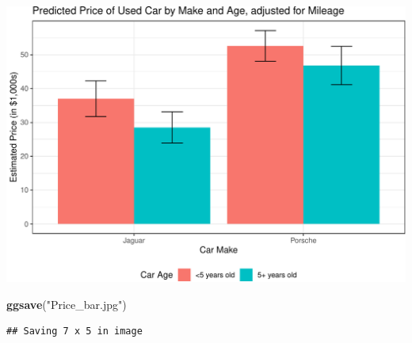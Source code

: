 \documentclass[]{article}
\newenvironment{Shaded}{\begin{snugshade}}{\end{snugshade}}
\newcommand{\KeywordTok}[1]{\textcolor[rgb]{0.13,0.29,0.53}{\textbf{#1}}}
\newcommand{\NormalTok}[1]{#1}
\newcommand{\StringTok}[1]{\textcolor[rgb]{0.31,0.60,0.02}{#1}}
\begin{document}
\includegraphics{Visualization_Examples_2020_v01_files/figure-latex/unnamed-chunk-15-1.pdf}

\begin{Shaded}
\begin{Highlighting}[]
\KeywordTok{ggsave}\NormalTok{(}\StringTok{"Price_bar.jpg"}\NormalTok{)}
\end{Highlighting}
\end{Shaded}

\begin{verbatim}
## Saving 7 x 5 in image
\end{verbatim}
\end{document}
